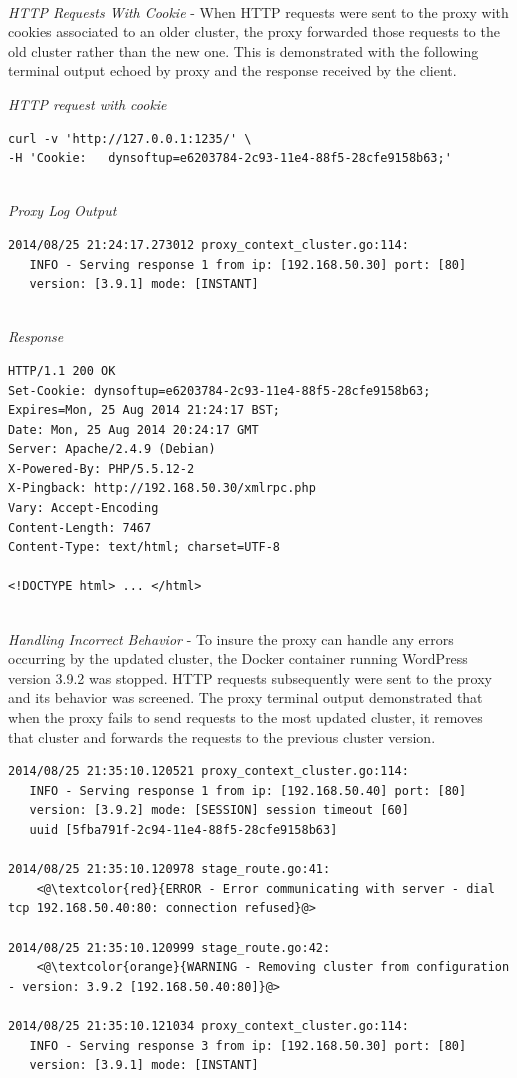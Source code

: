\documentclass[a4paper,11pt,twoside]{report}
\begin{document}
\noindent\\
\textit{HTTP Requests With Cookie} - When HTTP requests were sent to the proxy with cookies  associated to an older cluster, the proxy forwarded those requests to the old cluster rather than the new one. This is demonstrated with the following terminal output echoed by proxy and the response received by the client. \medskip 

\noindent
\textit{HTTP request with cookie}
\begin{lstlisting}[language=terminal]
curl -v 'http://127.0.0.1:1235/' \
-H 'Cookie:   dynsoftup=e6203784-2c93-11e4-88f5-28cfe9158b63;'
\end{lstlisting}

\noindent\\
\textit{Proxy Log Output}
\begin{lstlisting}[language=terminal]
2014/08/25 21:24:17.273012 proxy_context_cluster.go:114:     
   INFO - Serving response 1 from ip: [192.168.50.30] port: [80] 
   version: [3.9.1] mode: [INSTANT]
\end{lstlisting}

\noindent\\
\textit{Response}
\begin{lstlisting}[language=terminal]
HTTP/1.1 200 OK
Set-Cookie: dynsoftup=e6203784-2c93-11e4-88f5-28cfe9158b63; Expires=Mon, 25 Aug 2014 21:24:17 BST;
Date: Mon, 25 Aug 2014 20:24:17 GMT
Server: Apache/2.4.9 (Debian)
X-Powered-By: PHP/5.5.12-2
X-Pingback: http://192.168.50.30/xmlrpc.php
Vary: Accept-Encoding
Content-Length: 7467
Content-Type: text/html; charset=UTF-8

<!DOCTYPE html> ... </html>
\end{lstlisting}

\noindent\\
\textit{Handling Incorrect Behavior} - To insure the proxy can handle any errors occurring by the updated cluster, the Docker container running WordPress version 3.9.2 was stopped. HTTP requests subsequently were sent to the proxy and its behavior was screened. The proxy terminal output demonstrated that when the proxy fails to send requests to the most updated cluster, it removes that cluster and forwards the requests to the previous cluster version.  \smallskip

\begin{lstlisting}[language=terminal]
2014/08/25 21:35:10.120521 proxy_context_cluster.go:114:     
   INFO - Serving response 1 from ip: [192.168.50.40] port: [80] 
   version: [3.9.2] mode: [SESSION] session timeout [60] 
   uuid [5fba791f-2c94-11e4-88f5-28cfe9158b63]

2014/08/25 21:35:10.120978 stage_route.go:41:    
    <@\textcolor{red}{ERROR - Error communicating with server - dial tcp 192.168.50.40:80: connection refused}@>
   
2014/08/25 21:35:10.120999 stage_route.go:42:  
    <@\textcolor{orange}{WARNING - Removing cluster from configuration - version: 3.9.2 [192.168.50.40:80]}@>

2014/08/25 21:35:10.121034 proxy_context_cluster.go:114:     
   INFO - Serving response 3 from ip: [192.168.50.30] port: [80] 
   version: [3.9.1] mode: [INSTANT]
\end{lstlisting}
 
\end{document}
